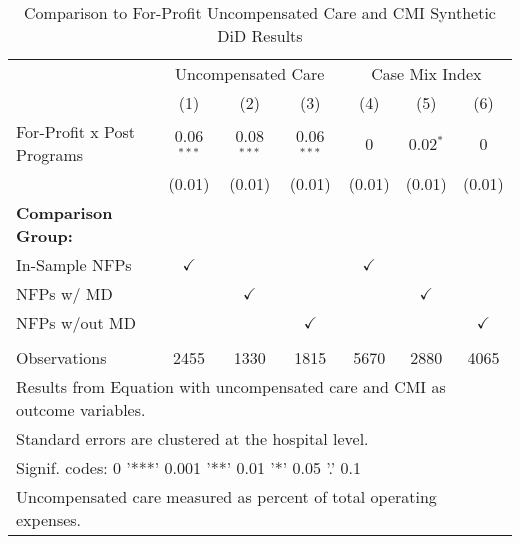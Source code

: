 \begin{table}[ht!]

\caption{\label{tab:forprofit_uncompCMI_synth}Comparison to For-Profit Uncompensated Care and CMI Synthetic DiD Results}
\centering
\begin{tabular}[t]{lcccccc}
\toprule
\multicolumn{1}{c}{ } & \multicolumn{3}{c}{Uncompensated Care} & \multicolumn{3}{c}{Case Mix Index} \\
\cmidrule(l{3pt}r{3pt}){2-4} \cmidrule(l{3pt}r{3pt}){5-7}
 & (1) & (2) & (3) & (4) & (5) & (6)\\
\midrule
For-Profit x Post Programs & 0.06$^{***}$ & 0.08$^{***}$ & 0.06$^{***}$ & 0 & 0.02$^{*}$ & 0\\
 & (0.01) & (0.01) & (0.01) & (0.01) & (0.01) & (0.01)\\
\textbf{Comparison Group:} &  &  &  &  &  & \\
In-Sample NFPs & $\checkmark$ &  &  & $\checkmark$ &  & \\
NFPs w/ MD &  & $\checkmark$ &  &  & $\checkmark$ & \\
\addlinespace
NFPs w/out MD &  &  & $\checkmark$ &  &  & $\checkmark$\\
 &  &  &  &  &  & \\
Observations & 2455 & 1330 & 1815 & 5670 & 2880 & 4065\\
\bottomrule
\multicolumn{7}{l}{\textsuperscript{} Results from Equation with uncompensated care and CMI as outcome variables.}\\
\multicolumn{7}{l}{\textsuperscript{} Standard errors are clustered at the hospital level.}\\
\multicolumn{7}{l}{\textsuperscript{} Signif. codes: 0 '***' 0.001 '**' 0.01 '*' 0.05 '.' 0.1}\\
\multicolumn{7}{l}{\textsuperscript{} Uncompensated care measured as percent of total operating expenses.}\\
\end{tabular}
\end{table}

